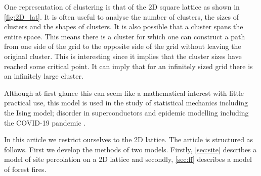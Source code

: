 \documentclass[%
 reprint,
 amsmath,amssymb,
 aps,
]{revtex4-2}
\begin{document}
One representation of clustering is that of the 2D square lattice as shown in \cref{fig:2D_lat}. It is often useful to analyse the number of clusters, the sizes of clusters and the shapes of clusters. It is also possible that a cluster spans the entire space. This means there is a cluster for which one can construct a path from one side of the grid to the opposite side of the grid without leaving the original cluster. This is interesting since it implies that the cluster sizes have reached some critical point. It can imply that for an infinitely sized grid there is an infinitely large cluster. 

Although at first glance this can seem like a mathematical interest with little practical use, this model is used in the study of statistical mechanics including the Ising model; disorder in superconductors \cite{alexander_superconductivity_1983} and epidemic modelling including the COVID-19 pandemic \cite{mello_epidemics_2020}.

In this article we restrict ourselves to the 2D lattice. The article is structured as follows. First we develop the methods of two models. Firstly, \cref{sec:site} describes a model of site percolation on a 2D lattice and secondly, \cref{sec:ff} describes a model of forest fires. 


\end{document}
